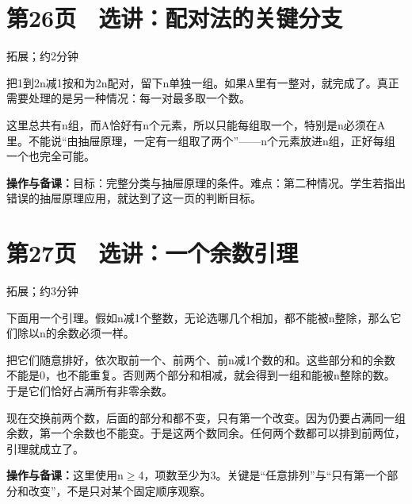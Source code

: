 \documentclass[UTF8,a4paper,11pt,fontset=fandol]{ctexart}
\newcommand{\tip}[1]{\par{\small\color{black!65}\noindent\textbf{操作与备课：}#1\par}}
\begin{document}
\par\noindent\begin{minipage}{\linewidth}

\section*{第26页　选讲：配对法的关键分支}

{\small\noindent 拓展；约2分钟\par}

把1到2n减1按和为2n配对，留下n单独一组。如果A里有一整对，就完成了。真正需要处理的是另一种情况：每一对最多取一个数。

这里总共有n组，而A恰好有n个元素，所以只能每组取一个，特别是n必须在A里。不能说“由抽屉原理，一定有一组取了两个”——n个元素放进n组，正好每组一个也完全可能。

\tip{目标：完整分类与抽屉原理的条件。难点：第二种情况。学生若指出错误的抽屉原理应用，就达到了这一页的判断目标。}

\end{minipage}\par\vspace{2mm}

\par\noindent\begin{minipage}{\linewidth}

\section*{第27页　选讲：一个余数引理}

{\small\noindent 拓展；约3分钟\par}

下面用一个引理。假如n减1个整数，无论选哪几个相加，都不能被n整除，那么它们除以n的余数必须一样。

把它们随意排好，依次取前一个、前两个、前n减1个数的和。这些部分和的余数不能是0，也不能重复。否则两个部分和相减，就会得到一组和能被n整除的数。于是它们恰好占满所有非零余数。

现在交换前两个数，后面的部分和都不变，只有第一个改变。因为仍要占满同一组余数，第一个余数也不能变。于是这两个数同余。任何两个数都可以排到前两位，引理就成立了。

\tip{这里使用n$\ge$4，项数至少为3。关键是“任意排列”与“只有第一个部分和改变”，不是只对某个固定顺序观察。}

\end{minipage}\par\vspace{2mm}
\end{document}
